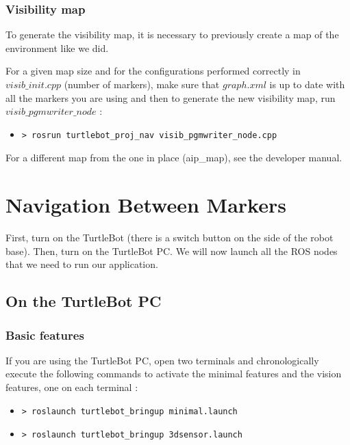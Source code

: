 \documentclass[10pt,a4paper]{article}
\begin{document}
\subsubsection{Visibility map}
\label{sec:visibilityMap}

To generate the visibility map, it is necessary to previously create a map of the environment like we did.

For a given map size and for the configurations performed correctly in $ visib\_init.cpp$ (number of markers), make sure that $graph.xml$ is up to date with all the markers you are using and then to generate the new visibility map, run $visib\_pgmwriter\_node$ :

\begin{itemize}
\item[]  \begin{verbatim}> rosrun turtlebot_proj_nav visib_pgmwriter_node.cpp \end{verbatim}
\end{itemize}

For a different map from the one in place (aip\_map), see the developer manual.

\newpage
\section{Navigation Between Markers}
\label{sec:Navigation Between Markers}

First, turn on the TurtleBot (there is a switch button on the side of the robot base). Then, turn on the TurtleBot PC. We will now launch all the ROS nodes that we need to run our application.

\subsection{On the TurtleBot PC}

\subsubsection{Basic features}

If you are using the TurtleBot PC, open two terminals and chronologically execute the following commands to activate the minimal features and the vision features, one on each terminal :

\begin{itemize}
\item[]  \begin{verbatim}> roslaunch turtlebot_bringup minimal.launch \end{verbatim}
\item[]  \begin{verbatim}> roslaunch turtlebot_bringup 3dsensor.launch \end{verbatim}
\end{itemize}
\end{document}

